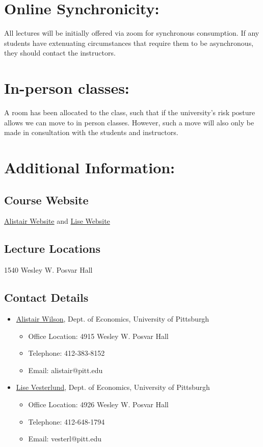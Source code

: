 \documentclass[11pt,english]{article}
\begin{document}
\section*{Online Synchronicity:}
All lectures will be initially offered via zoom for synchronous consumption. If any students have extenuating circumstances that require them to be asynchronous, they should contact the instructors.

\section*{In-person classes:}
A room has been allocated to the class, such that if the university's risk posture allows we can move to in person classes. However, such a move will also only be made in consultation with the students and instructors. 

\section*{Additional Information:}
\subsection*{Course Website}
\href{http://www.pitt.edu/~alistair/}{Alistair Website}
and \href{http://www.pitt.edu/~vester/}{Lise Website}

\subsection*{Lecture Locations }

1540 Wesley W. Posvar Hall 

\subsection*{Contact Details}
\begin{itemize}
    \item \href{http://www.pitt.edu/~alistair/}{Alistair Wilson}, Dept. of
    Economics, University of Pittsburgh
    
        \begin{itemize}
        \item Office Location: 4915 Wesley W. Posvar Hall
        \item Telephone: 412-383-8152
        \item Email: alistair@pitt.edu
        \end{itemize}
    \item \href{http://pitt.edu/~vester}{Lise Vesterlund}, Dept. of Economics,
    University of Pittsburgh
    
        \begin{itemize}
        \item Office Location: 4926 Wesley W. Posvar Hall
        \item Telephone: 412-648-1794
        \item Email: vesterl@pitt.edu
        \end{itemize}
\end{itemize}
\end{document}
